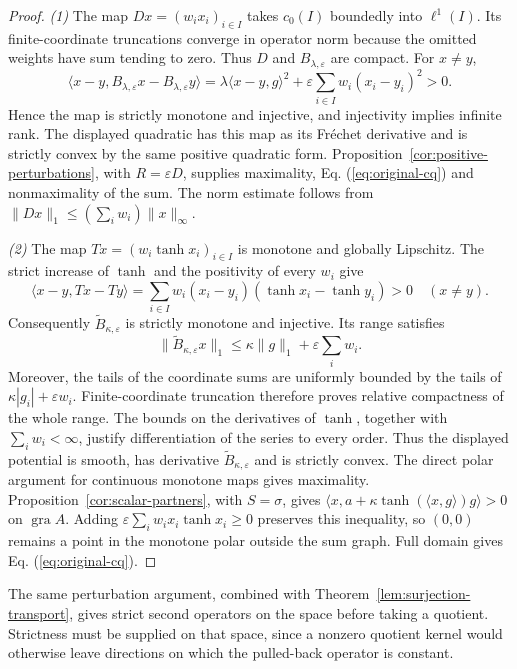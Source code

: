 \documentclass[11pt]{article}
\newcommand{\gra}{\operatorname{gra}}
\newcommand{\pair}[2]{\langle #1,#2\rangle}
\theoremstyle{definition}
\theoremstyle{remark}
\begin{document}
\begin{proof}
\noindent\textit{(1)} The map $Dx=(w_ix_i)_{i\in I}$ takes $c_0(I)$ boundedly into $\ell^1(I)$. Its finite-coordinate truncations converge in operator norm because the omitted weights have sum tending to zero. Thus $D$ and $B_{\lambda,\varepsilon}$ are compact. For $x\ne y$,
\[
\pair{x-y}{B_{\lambda,\varepsilon}x-B_{\lambda,\varepsilon}y}
=\lambda\pair{x-y}{g}^2+\varepsilon\sum_{i\in I}w_i(x_i-y_i)^2>0.
\]
Hence the map is strictly monotone and injective, and injectivity implies infinite rank. The displayed quadratic has this map as its Fr\'{e}chet derivative and is strictly convex by the same positive quadratic form. Proposition~\ref{cor:positive-perturbations}, with $R=\varepsilon D$, supplies maximality, Eq. (\ref{eq:original-cq}) and nonmaximality of the sum. The norm estimate follows from $\|Dx\|_1\le(\sum_iw_i)\|x\|_\infty$.

\noindent\textit{(2)} The map $Tx=(w_i\tanh x_i)_{i\in I}$ is monotone and globally Lipschitz. The strict increase of $\tanh$ and the positivity of every $w_i$ give
\[
\pair{x-y}{Tx-Ty}
=\sum_{i\in I}w_i(x_i-y_i)(\tanh x_i-\tanh y_i)>0
\quad(x\ne y).
\]
Consequently $\widetilde B_{\kappa,\varepsilon}$ is strictly monotone and injective. Its range satisfies
\[
\|\widetilde B_{\kappa,\varepsilon}x\|_1
\le\kappa\|g\|_1+\varepsilon\sum_iw_i.
\]
Moreover, the tails of the coordinate sums are uniformly bounded by the tails of $\kappa|g_i|+\varepsilon w_i$. Finite-coordinate truncation therefore proves relative compactness of the whole range. The bounds on the derivatives of $\tanh$, together with $\sum_iw_i<\infty$, justify differentiation of the series to every order. Thus the displayed potential is smooth, has derivative $\widetilde B_{\kappa,\varepsilon}$ and is strictly convex. The direct polar argument for continuous monotone maps gives maximality. Proposition~\ref{cor:scalar-partners}, with $S=\sigma$, gives $\pair{x}{a+\kappa\tanh(\pair{x}{g})g}>0$ on $\gra A$. Adding $\varepsilon\sum_iw_ix_i\tanh x_i\ge0$ preserves this inequality, so $(0,0)$ remains a point in the monotone polar outside the sum graph. Full domain gives Eq. (\ref{eq:original-cq}).
\end{proof}

The same perturbation argument, combined with Theorem~\ref{lem:surjection-transport}, gives strict second operators on the space before taking a quotient. Strictness must be supplied on that space, since a nonzero quotient kernel would otherwise leave directions on which the pulled-back operator is constant.
\end{document}

